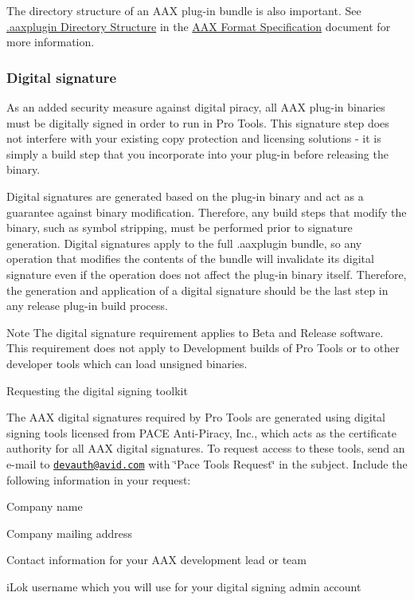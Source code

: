 The directory structure of an A\+A\+X plug-\/in bundle is also important. See \hyperlink{a00331_commoninterface_formatspecification__aaxplugin_directory_structure}{.aaxplugin Directory Structure} in the \hyperlink{a00331}{A\+A\+X Format Specification} document for more information.

\hypertarget{a00360_subsection__digital_signature_}{}\subsubsection{Digital signature}\label{a00360_subsection__digital_signature_}
 As an added security measure against digital piracy, all A\+A\+X plug-\/in binaries must be digitally signed in order to run in Pro Tools. This signature step does not interfere with your existing copy protection and licensing solutions -\/ it is simply a build step that you incorporate into your plug-\/in before releasing the binary.

Digital signatures are generated based on the plug-\/in binary and act as a guarantee against binary modification. Therefore, any build steps that modify the binary, such as symbol stripping, must be performed prior to signature generation. Digital signatures apply to the full .aaxplugin bundle, so any operation that modifies the contents of the bundle will invalidate its digital signature even if the operation does not affect the plug-\/in binary itself. Therefore, the generation and application of a digital signature should be the last step in any release plug-\/in build process.

\begin{DoxyNote}{Note}
The digital signature requirement applies to Beta and Release software. This requirement does not apply to Development builds of Pro Tools or to other developer tools which can load unsigned binaries.
\end{DoxyNote}
 Requesting the digital signing toolkit

The A\+A\+X digital signatures required by Pro Tools are generated using digital signing tools licensed from P\+A\+C\+E Anti-\/\+Piracy, Inc., which acts as the certificate authority for all A\+A\+X digital signatures. To request access to these tools, send an e-\/mail to \href{mailto:devauth@avid.com}{\tt devauth@avid.\+com} with \char`\"{}\+Pace Tools Request\char`\"{} in the subject. Include the following information in your request\+:


\begin{DoxyItemize}
\item Company name
\item Company mailing address
\item Contact information for your A\+A\+X development lead or team
\item i\+Lok username which you will use for your digital signing admin account
\end{DoxyItemize}

